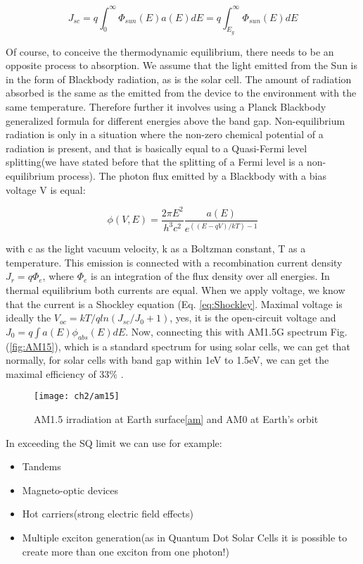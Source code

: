 \begin{equation}
J_{sc} = q \int_0 ^{\infty } \Phi _{sun}(E)a(E)dE=q \int_{E_g} ^{\infty } \Phi _{sun}(E)dE
\end{equation}

Of course, to conceive the thermodynamic equilibrium, there needs to be an opposite process to absorption. We assume that the light emitted from the Sun is in the form of Blackbody radiation, as is the solar cell. The amount of radiation absorbed is the same as the emitted from the device to the environment with the same temperature. Therefore further it involves using a Planck Blackbody generalized formula for different energies above the band gap. Non-equilibrium radiation is only in a situation where the non-zero chemical potential of a radiation is present, and that is basically equal to a Quasi-Fermi level splitting(we have stated before that the splitting of a Fermi level is a non-equilibrium process). The photon flux emitted by a Blackbody with a bias voltage V is equal:

\begin{equation}
\phi (V,E) = \frac{2\pi E^2}{h^3c^2}\frac{a(E)}{e^{(( E-qV)/kT) - 1}}
\end{equation}

with c as the light vacuum velocity, k as a Boltzman constant, T as a temperature. This emission is connected with a recombination current density $J_r = q\Phi _e$, where $\Phi  _e$ is an integration of the flux density over all energies. In thermal equilibrium both currents are equal. When we apply voltage, we know that the current is a Shockley equation (Eq. \ref{eq:Shockley}. Maximal voltage is ideally the $V_{oc} = kT/qln(J_{sc}/J_{0} + 1)$, yes, it is the open-circuit voltage and $J_0 = q \int a(E)\phi _{abs}(E) dE$. Now, connecting this with AM1.5G spectrum Fig.(\ref{fig:AM15}), which is a standard spectrum for using solar cells, we can get that normally, for solar cells with band gap within 1eV to 1.5eV, we can get the maximal efficiency of 33\%  . \cite{limit}

\begin{figure}
\centering
\texttt{[image: ch2/am15]}
\caption{AM1.5 irradiation at Earth surface\ref{am} and AM0 at Earth's orbit}
\label{AM15}
\end{figure}

In exceeding the SQ limit we can use for example:
\begin{itemize}
\item Tandems
\item Magneto-optic devices
\item Hot carriers(strong electric field effects)
\item Multiple exciton generation(as in Quantum Dot Solar Cells it is possible to create more than one exciton from one photon!)
\end{itemize}

